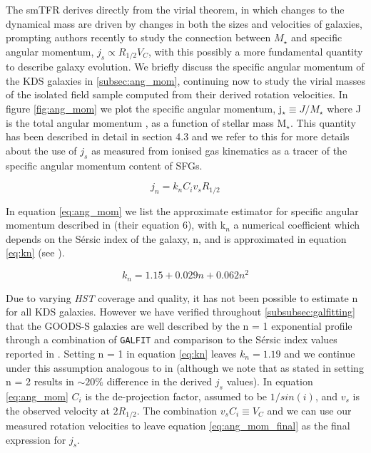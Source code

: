 \documentclass[a4paper,fleqn,usenatbib]{mn2e}
\newcommand{\Sers}{S\'{e}rsic }
\begin{document}
The smTFR derives directly from the virial theorem, in which changes to the dynamical mass are driven by changes in both the sizes and velocities of galaxies, prompting authors recently \citep[e.g.][]{Cortese2016,Contini2015a,Burkert2016a,Harrison2017,Swinbank2017} to study the connection between $M_{\star}$ and specific angular momentum, $j_{s} \propto R_{1/2}V_{C}$, with this possibly a more fundamental quantity to describe galaxy evolution.
We briefly discuss the specific angular momentum of the KDS galaxies in \cref{subsec:ang_mom}, continuing now to study the virial masses of the isolated field sample computed from their derived rotation velocities.
In figure \ref{fig:ang_mom} we plot the specific angular momentum, j$_{\star} \equiv J/M_{\star}$ where J is the total angular momentum \citep{Fall1983}, as a function of stellar mass M$_{\star}$.
This quantity has been described in detail in \cite{Harrison2017} section 4.3 and we refer to this for more details about the use of $j_{s}$ as measured from ionised gas kinematics as a tracer of the specific angular momentum content of SFGs.

\begin{equation}\label{eq:ang_mom}
   j_{n} = k_{n}C_{i}v_{s}R_{1/2}
\end{equation}

In equation \ref{eq:ang_mom} we list the approximate estimator for specific angular momentum described in \cite{Romanowsky2012} (their equation 6), with k$_{n}$ a numerical coefficient which depends on the \Sers index of the galaxy, n, and is approximated in equation \ref{eq:kn} (see \cite{Romanowsky2012}).

\begin{equation}\label{eq:kn}
   k_{n} = 1.15 + 0.029n + 0.062n^{2}
\end{equation}

Due to varying {\em HST} coverage and quality, it has not been possible to estimate n for all KDS galaxies.
However we have verified throughout \cref{subsubsec:galfitting} that the GOODS-S galaxies are well described by the n = 1 exponential profile through a combination of {\tt GALFIT} and comparison to the \Sers index values reported in \cite{VanderWel2012}.
Setting n = 1 in equation \ref{eq:kn} leaves $k_{n} = 1.19$ and we continue under this assumption analogous to in \cite{Harrison2017} (although we note that as stated in \cite{Harrison2017} setting n = 2 results in $\sim20\%$ difference in the derived $j_{s}$ values).
In equation \ref{eq:ang_mom} $C_{i}$ is the de-projection factor, assumed to be $1/sin(i)$, and $v_{s}$ is the observed velocity at $2R_{1/2}$.
The combination $v_{s}C_{i} \equiv V_{C}$ and we can use our measured rotation velocities to leave equation \ref{eq:ang_mom_final} as the final expression for $j_{s}$. 
\end{document}
